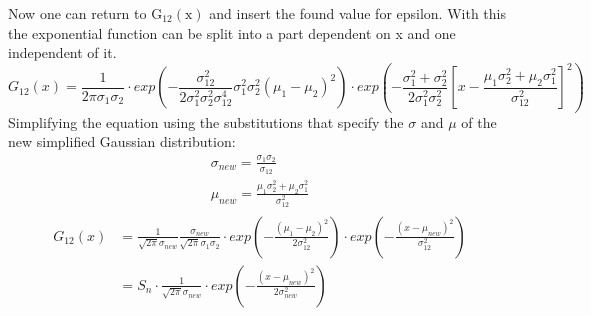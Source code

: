 \documentclass[twoside,openright]{scrreprt}
\begin{document}
Now one can return to $\mathrm{G_{12}(x)}$ and insert the found value for epsilon. With this the exponential function can be split into a part dependent on x and one independent of it.
\begin{equation*}
G_{12}(x) = \frac{1}{2\pi\sigma_1\sigma_2}\cdot exp\left(- \frac{\sigma_{12}^2}{2\sigma_1^2\sigma_2^2\sigma_{12}^4}\sigma_1^2\sigma_2^2\left(\mu_1-\mu_2\right)^2
\right) \cdot
exp\left(-\frac{\sigma_1^2+\sigma_2^2}{2\sigma_1^2\sigma_2^2} \left[x - \frac{\mu_1\sigma_2^2+\mu_2\sigma_1^2}{\sigma_{12}^2}\right]^2 \right)
\end{equation*}
Simplifying the equation using the substitutions that specify the $\sigma$ and $\mu$ of the new simplified Gaussian distribution:
\begin{gather*}
\sigma_{new} = \frac{\sigma_1\sigma_2}{\sigma_{12}}\\
\mu_{new} = \frac{\mu_1\sigma_2^2+ \mu_2\sigma_1^2}{\sigma_{12}^2}
\end{gather*}
\begin{gather*}
\begin{split}
G_{12}(x) & = \frac{1}{\sqrt{2\pi}\sigma_{new}}\frac{\sigma_{new}}{\sqrt{2\pi}\sigma_1\sigma_2}\cdot exp\left(- \frac{\left(\mu_1-\mu_2\right)^2}{2\sigma_{12}^2}\right) \cdot
exp\left(-\frac{\left(x-\mu_{new}\right)^2}{\sigma_{12}^2}\right)\\
& = S_n \cdot \frac{1}{\sqrt{2\pi}\sigma_{new}} \cdot exp\left(-\frac{\left(x-\mu_{new}\right)^2}{2\sigma_{new}^2}\right)
\end{split}
\end{gather*}





\end{document}
